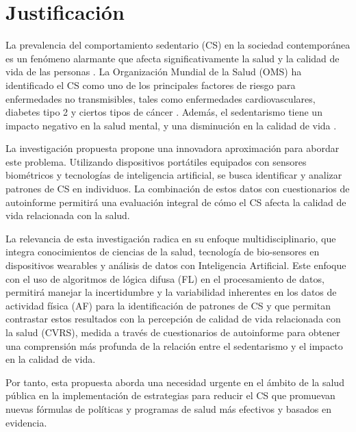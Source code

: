 \chapter{Justificación}
\label{chap:justificacion}

La prevalencia del comportamiento sedentario (CS) en la sociedad contemporánea es un fenómeno alarmante que afecta significativamente la salud y la calidad de vida de las personas \citep{Guthold2020GlobalTrends,Swinburn2019Syndemic}. La Organización Mundial de la Salud (OMS) ha identificado el CS como uno de los principales factores de riesgo para enfermedades no transmisibles, tales como enfermedades cardiovasculares, diabetes tipo 2 y ciertos tipos de cáncer \citep{DiPietro2020PhysicalActivity,Murray2020GlobalBurden,Okunogbe2021EconomicImpact,WHO2009GlobalRisks}. Además, el sedentarismo tiene un impacto negativo en la salud mental, y una disminución en la calidad de vida \citep{DiPietro2020PhysicalActivity,Guthold2020GlobalTrends,Swinburn2019Syndemic}.

La investigación propuesta propone una innovadora aproximación para abordar este problema. Utilizando dispositivos portátiles equipados con sensores biométricos y tecnologías de inteligencia artificial, se busca identificar y analizar patrones de CS en individuos. La combinación de estos datos con cuestionarios de autoinforme permitirá una evaluación integral de cómo el CS afecta la calidad de vida relacionada con la salud.

La relevancia de esta investigación radica en su enfoque multidisciplinario, que integra conocimientos de ciencias de la salud, tecnología de bio-sensores en dispositivos wearables y análisis de datos con Inteligencia Artificial. Este enfoque con el uso de algoritmos de lógica difusa (FL) en el procesamiento de datos, permitirá manejar la incertidumbre y la variabilidad inherentes en los datos de actividad física (AF) para la identificación de patrones de CS y que permitan contrastar estos resultados con la percepción de calidad de vida relacionada con la salud (CVRS), medida a través de cuestionarios de autoinforme para obtener una comprensión más profunda de la relación entre el sedentarismo y el impacto en la calidad de vida.

Por tanto, esta propuesta aborda una necesidad urgente en el ámbito de la salud pública en la implementación de estrategias para reducir el CS que promuevan nuevas fórmulas de políticas y programas de salud más efectivos y basados en evidencia.
